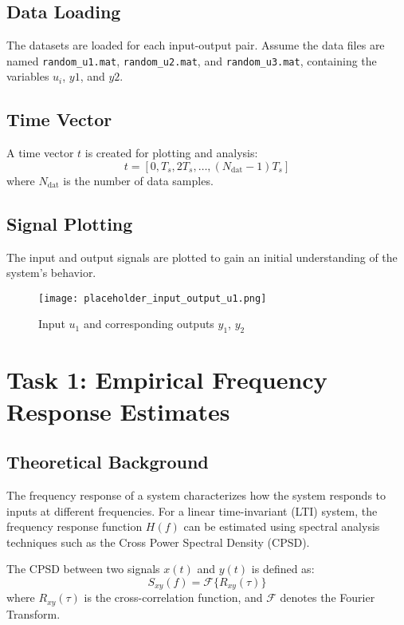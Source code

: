 \documentclass[12pt]{article}
\begin{document}
\subsection{Data Loading}
The datasets are loaded for each input-output pair. Assume the data files are named \texttt{random\_u1.mat}, \texttt{random\_u2.mat}, and \texttt{random\_u3.mat}, containing the variables $u_i$, $y1$, and $y2$.

\subsection{Time Vector}
A time vector $t$ is created for plotting and analysis:
\begin{equation}
    t = [0, T_s, 2T_s, \dots, (N_{\text{dat}} - 1)T_s]
\end{equation}
where $N_{\text{dat}}$ is the number of data samples.

\subsection{Signal Plotting}
The input and output signals are plotted to gain an initial understanding of the system's behavior.

\begin{figure}[H]
    \centering
    \texttt{[image: placeholder\_input\_output\_u1.png]}
    \caption{Input $u_1$ and corresponding outputs $y_1$, $y_2$}
    \label{fig:input_output_u1}
\end{figure}

\section{Task 1: Empirical Frequency Response Estimates}
\subsection{Theoretical Background}
The frequency response of a system characterizes how the system responds to inputs at different frequencies. For a linear time-invariant (LTI) system, the frequency response function $H(f)$ can be estimated using spectral analysis techniques such as the Cross Power Spectral Density (CPSD).

The CPSD between two signals $x(t)$ and $y(t)$ is defined as:
\begin{equation}
    S_{xy}(f) = \mathcal{F}\{R_{xy}(\tau)\}
\end{equation}
where $R_{xy}(\tau)$ is the cross-correlation function, and $\mathcal{F}$ denotes the Fourier Transform.
\end{document}
